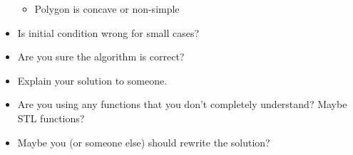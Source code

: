 \documentclass[9pt,a4paper,twocolumn,landscape,oneside]{amsart}
\newenvironment{myitemize}
{ \begin{itemize}[leftmargin=.5cm]
    \setlength{\itemsep}{0pt}
    \setlength{\parskip}{0pt}
    \setlength{\parsep}{0pt}     }
{ \end{itemize}                  }
\begin{document}
\begin{multicols*}{3}
\begin{myitemize}
\begin{itemize}
\begin{itemize}
                                \item Polygon is concave or non-simple
                            \end{itemize}
                        \item Is initial condition wrong for small cases?
                        \item Are you sure the algorithm is correct?
                        \item Explain your solution to someone.
                        \item Are you using any functions that you don't completely understand? Maybe STL functions?
                        \item Maybe you (or someone else) should rewrite the solution?
                    \end{itemize}
            \end{myitemize}


\end{multicols*}
\end{document}
